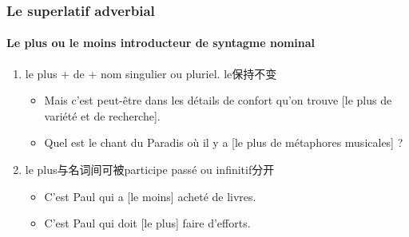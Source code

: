 \documentclass[UTF8]{report}
\begin{document}
\subsubsection{Le superlatif adverbial}

\paragraph{Le plus ou le moins introducteur de syntagme nominal}
\begin{enumerate}
    \item le plus + de + nom singulier ou pluriel. le保持不变
    \begin{itemize}
        \item Mais c’est peut-être dans les détails de confort qu’on trouve [le plus de variété et de recherche]. 
        \item Quel est le chant du Paradis où il y a [le plus de métaphores musicales] ? 
    \end{itemize}
    \item le plus与名词间可被participe passé ou infinitif分开
    \begin{itemize}
        \item C’est Paul qui a [le moins] acheté de livres.
        \item C’est Paul qui doit [le plus] faire d’efforts.
    \end{itemize}
\end{enumerate}
\end{document}
